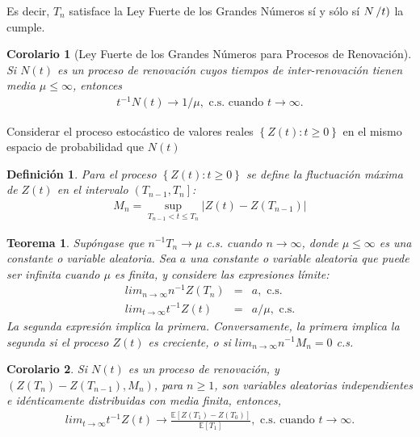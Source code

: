 \documentclass{article}
\newtheorem{Def}{Definición}
\newtheorem{Teo}{Teorema}
\newtheorem{Coro}{Corolario}
\newcommand{\esp}{\mathbb{E}}
\begin{document}
Es decir, $T_{n}$ satisface la Ley Fuerte de los Grandes N\'umeros s\'i y s\'olo s\'i $N\left/t\right)$ la cumple.


\begin{Coro}[Ley Fuerte de los Grandes N\'umeros para Procesos de Renovaci\'on]
Si $N\left(t\right)$ es un proceso de renovaci\'on cuyos tiempos de inter-renovaci\'on tienen media $\mu\leq\infty$, entonces
\begin{eqnarray}
t^{-1}N\left(t\right)\rightarrow 1/\mu,\textrm{ c.s. cuando }t\rightarrow\infty.
\end{eqnarray}

\end{Coro}


Considerar el proceso estoc\'astico de valores reales $\left\{Z\left(t\right):t\geq0\right\}$ en el mismo espacio de probabilidad que $N\left(t\right)$

\begin{Def}
Para el proceso $\left\{Z\left(t\right):t\geq0\right\}$ se define la fluctuaci\'on m\'axima de $Z\left(t\right)$ en el intervalo $\left(T_{n-1},T_{n}\right]$:
\begin{eqnarray*}
M_{n}=\sup_{T_{n-1}<t\leq T_{n}}|Z\left(t\right)-Z\left(T_{n-1}\right)|
\end{eqnarray*}
\end{Def}

\begin{Teo}
Sup\'ongase que $n^{-1}T_{n}\rightarrow\mu$ c.s. cuando $n\rightarrow\infty$, donde $\mu\leq\infty$ es una constante o variable aleatoria. Sea $a$ una constante o variable aleatoria que puede ser infinita cuando $\mu$ es finita, y considere las expresiones l\'imite:
\begin{eqnarray}
lim_{n\rightarrow\infty}n^{-1}Z\left(T_{n}\right)&=&a,\textrm{ c.s.}\\
lim_{t\rightarrow\infty}t^{-1}Z\left(t\right)&=&a/\mu,\textrm{ c.s.}
\end{eqnarray}
La segunda expresi\'on implica la primera. Conversamente, la primera implica la segunda si el proceso $Z\left(t\right)$ es creciente, o si $lim_{n\rightarrow\infty}n^{-1}M_{n}=0$ c.s.
\end{Teo}

\begin{Coro}
Si $N\left(t\right)$ es un proceso de renovaci\'on, y $\left(Z\left(T_{n}\right)-Z\left(T_{n-1}\right),M_{n}\right)$, para $n\geq1$, son variables aleatorias independientes e id\'enticamente distribuidas con media finita, entonces,
\begin{eqnarray}
lim_{t\rightarrow\infty}t^{-1}Z\left(t\right)\rightarrow\frac{\esp\left[Z\left(T_{1}\right)-Z\left(T_{0}\right)\right]}{\esp\left[T_{1}\right]},\textrm{ c.s. cuando  }t\rightarrow\infty.
\end{eqnarray}
\end{Coro}
\end{document}

